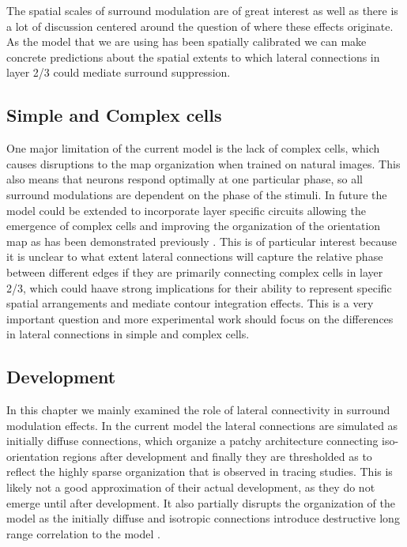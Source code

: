 The spatial scales of surround modulation are of great interest as
well as there is a lot of discussion centered around the question of
where these effects originate. As the model that we are using has been
spatially calibrated we can make concrete predictions about the
spatial extents to which lateral connections in layer 2/3 could
mediate surround suppression.

\subsection{Simple and Complex cells}

One major limitation of the current model is the lack of complex
cells, which causes disruptions to the map organization when trained
on natural images. This also means that neurons respond optimally at
one particular phase, so all surround modulations are dependent on the
phase of the stimuli. In future the model could be extended to
incorporate layer specific circuits allowing the emergence of complex
cells and improving the organization of the orientation map as has
been demonstrated previously \citep{Antolik2010}. This is of
particular interest because it is unclear to what extent lateral
connections will capture the relative phase between different edges if
they are primarily connecting complex cells in layer 2/3, which could
haave strong implications for their ability to represent specific
spatial arrangements and mediate contour integration effects. This is
a very important question and more experimental work should focus on
the differences in lateral connections in simple and complex cells.

\subsection{Development}

In this chapter we mainly examined the role of lateral connectivity in
surround modulation effects. In the current model the lateral
connections are simulated as initially diffuse connections, which
organize a patchy architecture connecting iso-orientation regions
after development and finally they are thresholded as to reflect the
highly sparse organization that is observed in tracing studies. This
is likely not a good approximation of their actual development, as
they do not emerge until after development. It also partially disrupts
the organization of the model as the initially diffuse and isotropic
connections introduce destructive long range correlation to the model
\citep{Miikkulainen2005}.

